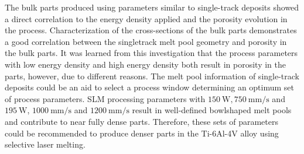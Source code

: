 \documentclass[10pt]{article}
\begin{document}
The bulk parts produced using parameters similar to single-track deposits showed a direct correlation to the energy density applied and the porosity evolution in the process. Characterization of the cross-sections of the bulk parts demonstrates a good correlation between the singletrack melt pool geometry and porosity in the bulk parts. It was learned from this investigation that the process parameters with low energy density and high energy density both result in porosity in the parts, however, due to different reasons. The melt pool information of single-track deposits could be an aid to select a process window determining an optimum set of process parameters. SLM processing parameters with $150 \mathrm{~W}, 750 \mathrm{~mm} / \mathrm{s}$ and $195 \mathrm{~W}$, $1000 \mathrm{~mm} / \mathrm{s}$ and $1200 \mathrm{~mm} / \mathrm{s}$ result in well-defined bowlshaped melt pools and contribute to near fully dense parts. Therefore, these sets of parameters could be recommended to produce denser parts in the Ti-6Al-4V alloy using selective laser melting.
\end{document}
